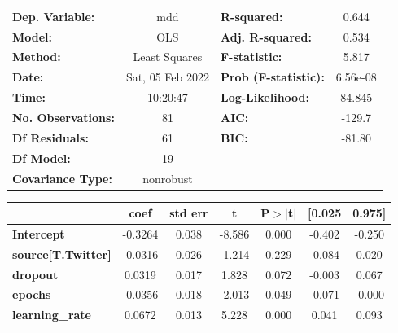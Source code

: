\begin{center}
\begin{tabular}{lclc}
\toprule
\textbf{Dep. Variable:}                   &       mdd        & \textbf{  R-squared:         } &     0.644   \\
\textbf{Model:}                           &       OLS        & \textbf{  Adj. R-squared:    } &     0.534   \\
\textbf{Method:}                          &  Least Squares   & \textbf{  F-statistic:       } &     5.817   \\
\textbf{Date:}                            & Sat, 05 Feb 2022 & \textbf{  Prob (F-statistic):} &  6.56e-08   \\
\textbf{Time:}                            &     10:20:47     & \textbf{  Log-Likelihood:    } &    84.845   \\
\textbf{No. Observations:}                &          81      & \textbf{  AIC:               } &    -129.7   \\
\textbf{Df Residuals:}                    &          61      & \textbf{  BIC:               } &    -81.80   \\
\textbf{Df Model:}                        &          19      & \textbf{                     } &             \\
\textbf{Covariance Type:}                 &    nonrobust     & \textbf{                     } &             \\
\bottomrule
\end{tabular}
\begin{tabular}{lcccccc}
                                          & \textbf{coef} & \textbf{std err} & \textbf{t} & \textbf{P$> |$t$|$} & \textbf{[0.025} & \textbf{0.975]}  \\
\midrule
\textbf{Intercept}                        &      -0.3264  &        0.038     &    -8.586  &         0.000        &       -0.402    &       -0.250     \\
\textbf{source[T.Twitter]}                &      -0.0316  &        0.026     &    -1.214  &         0.229        &       -0.084    &        0.020     \\
\textbf{dropout}                          &       0.0319  &        0.017     &     1.828  &         0.072        &       -0.003    &        0.067     \\
\textbf{epochs}                           &      -0.0356  &        0.018     &    -2.013  &         0.049        &       -0.071    &       -0.000     \\
\textbf{learning\_rate}                   &       0.0672  &        0.013     &     5.228  &         0.000        &        0.041    &        0.093     \\

\end{tabular}
\end{center}
